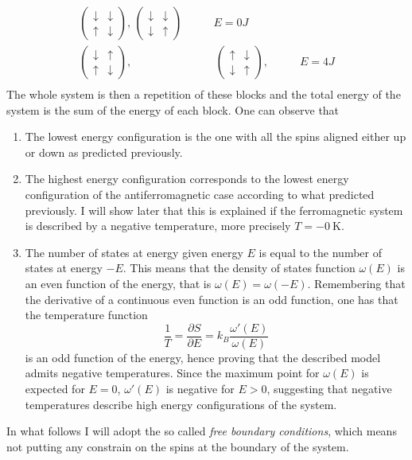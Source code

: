 \begin{align*}
    \begin{pmatrix} \downarrow & \downarrow \\ \uparrow & \downarrow \end{pmatrix}, \,
    \begin{pmatrix} \downarrow & \downarrow \\ \downarrow & \uparrow \end{pmatrix} \qquad &E = 0J \\
    \begin{pmatrix} \downarrow & \uparrow \\ \uparrow & \downarrow \end{pmatrix},& \,
    \begin{pmatrix} \uparrow & \downarrow \\ \downarrow & \uparrow \end{pmatrix}, \qquad &E = 4J \\
\end{align*}
The whole system is then a repetition of these blocks and the total energy of the system is the sum of the energy of each block. One can observe 
that 
\begin{enumerate}
    \item The lowest energy configuration is the one with all the spins aligned either up or down as predicted previously.
    \item The highest energy configuration corresponds to the lowest energy configuration of the antiferromagnetic case according to what predicted previously. I will show later that this 
    is explained if the ferromagnetic system is described by a negative temperature, more precisely $T = -\SI{0}{\kelvin}$.
    \item The number of states at energy given energy $E$ is equal to the number of states at energy $-E$. This means that the density of states function $\omega(E)$ is an even function 
    of the energy, that is $\omega(E) = \omega(-E)$. Remembering that the derivative of a continuous even function is an odd function, one has that the temperature function
    \begin{equation*}
        \frac{1}{T} = \frac{\partial S}{\partial E} = k_B \frac{\omega'(E)}{\omega(E)}
    \end{equation*}
    is an odd function of the energy, hence proving that the described model admits negative temperatures. Since the maximum point for $\omega(E)$ is expected for $E=0$, $\omega'(E)$ is negative for $E>0$,
    suggesting that negative temperatures describe high energy configurations of the system.
\end{enumerate}
In what follows I will adopt the so called \emph{free boundary conditions}, which means not putting any constrain on the spins at the boundary of the system.

